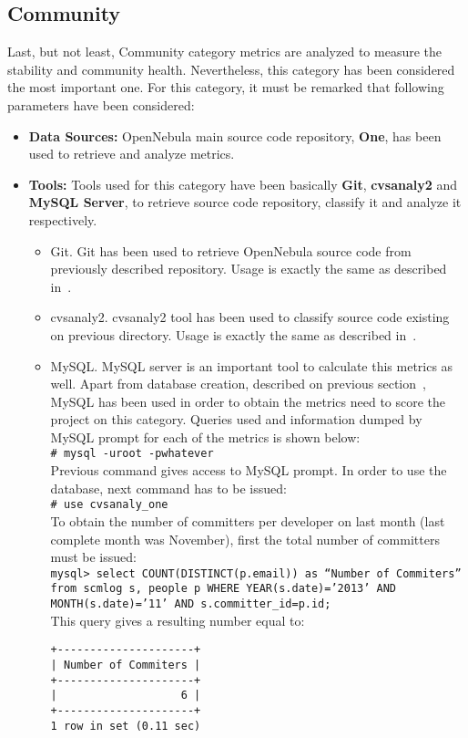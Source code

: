 \documentclass[11pt]{article}
\newcommand{\shellcmd}[1]{\\\indent\indent\texttt{\# #1}\\}
\newcommand{\mysqlcmd}[1]{\\\indent\indent\texttt{mysql> #1}\\}
\begin{document}
\subsection{Community}
Last, but not least, Community category metrics are analyzed to measure the stability and community health. Nevertheless, this category has been considered the most important one. For this category, it must be remarked that following parameters have been considered:
\begin{itemize}\itemsep0pt
\item{\textbf{Data Sources:}} OpenNebula main source code repository, \textbf{One}, has been used to retrieve and analyze metrics. 
\item{\textbf{Tools:}} Tools used for this category have been basically \textbf{Git}, \textbf{cvsanaly2} and \textbf{MySQL Server}, to retrieve source code repository, classify it and analyze it respectively. 
\begin{itemize}\itemsep0pt
\item{Git.} Git has been used to retrieve OpenNebula source code from previously described repository. Usage is exactly the same as described in~.
\item{cvsanaly2.} cvsanaly2 tool has been used to classify source code existing on previous directory. Usage is exactly the same as described in~.
\item{MySQL.} MySQL server is an important tool to calculate this metrics as well. Apart from database creation, described on previous section~, MySQL has been used in order to obtain the metrics need to score the project on this category. Queries used and information dumped by MySQL prompt for each of the metrics is shown below:
\shellcmd{mysql -uroot -pwhatever}
Previous command gives access to MySQL prompt. In order to use the database, next command has to be issued:
\shellcmd{use cvsanaly\_one}
To obtain the number of committers per developer on last month (last complete month was November), first the total number of committers must be issued:
\mysqlcmd{select COUNT(DISTINCT(p.email)) as ``Number of Commiters'' from scmlog s, people p WHERE YEAR(s.date)='2013' AND MONTH(s.date)='11' AND s.committer\_id=p.id;}
This query gives a resulting number equal to:
\begin{verbatim}
+---------------------+
| Number of Commiters |
+---------------------+
|                   6 |
+---------------------+
1 row in set (0.11 sec)

\end{verbatim}
\end{itemize}
\end{itemize}
\end{document}
